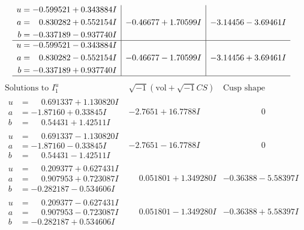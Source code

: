 \documentclass[1p]{elsarticle_modified}
\theoremstyle{definition}
\newcommand{\I}{\sqrt{-1}}
\begin{document}
$$\begin{array}{c|c|c}
\begin{aligned}
u &= -0.599521 + 0.343884 I \\
a &= \phantom{-}0.830282 + 0.552154 I \\
b &= -0.337189 - 0.937740 I\end{aligned}
 & -0.46677 + 1.70599 I & -3.14456 - 3.69461 I \\ \hline\begin{aligned}
u &= -0.599521 - 0.343884 I \\
a &= \phantom{-}0.830282 - 0.552154 I \\
b &= -0.337189 + 0.937740 I\end{aligned}
 & -0.46677 - 1.70599 I & -3.14456 + 3.69461 I\\
 \hline 
 \end{array}$$\newpage$$\begin{array}{c|c|c}  
\text{Solutions to }I^u_{1}& \I (\text{vol} + \sqrt{-1}CS) & \text{Cusp shape}\\
 \hline 
\begin{aligned}
u &= \phantom{-}0.691337 + 1.130820 I \\
a &= -1.87160 + 0.33845 I \\
b &= \phantom{-}0.54431 + 1.42511 I\end{aligned}
 & -2.7651 + 16.7788 I & \phantom{-0.000000 } 0 \\ \hline\begin{aligned}
u &= \phantom{-}0.691337 - 1.130820 I \\
a &= -1.87160 - 0.33845 I \\
b &= \phantom{-}0.54431 - 1.42511 I\end{aligned}
 & -2.7651 - 16.7788 I & \phantom{-0.000000 } 0 \\ \hline\begin{aligned}
u &= \phantom{-}0.209377 + 0.627431 I \\
a &= \phantom{-}0.907953 + 0.723087 I \\
b &= -0.282187 - 0.534606 I\end{aligned}
 & \phantom{-}0.051801 + 1.349280 I & -0.36388 - 5.58397 I \\ \hline\begin{aligned}
u &= \phantom{-}0.209377 - 0.627431 I \\
a &= \phantom{-}0.907953 - 0.723087 I \\
b &= -0.282187 + 0.534606 I\end{aligned}
 & \phantom{-}0.051801 - 1.349280 I & -0.36388 + 5.58397 I \\ \hline\begin{aligned}

\end{aligned}
\end{array}$$
\end{document}

